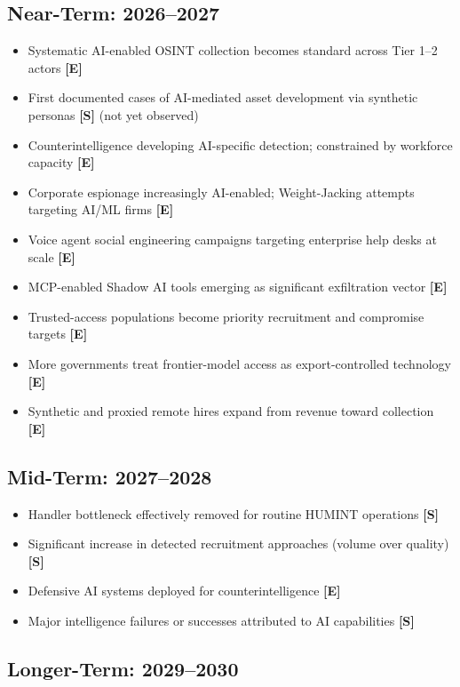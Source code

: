 \documentclass[11pt,letterpaper]{article}
\begin{document}
\subsection{Near-Term: 2026--2027}

\begin{itemize}
  \item Systematic AI-enabled OSINT collection becomes standard across Tier 1--2 actors \textbf{[E]}
  \item First documented cases of AI-mediated asset development via synthetic personas \textbf{[S]} (not yet observed)
  \item Counterintelligence developing AI-specific detection; constrained by workforce capacity \textbf{[E]}
  \item Corporate espionage increasingly AI-enabled; Weight-Jacking attempts targeting AI/ML firms \textbf{[E]}
  \item Voice agent social engineering campaigns targeting enterprise help desks at scale \textbf{[E]}
  \item MCP-enabled Shadow AI tools emerging as significant exfiltration vector \textbf{[E]}
  \item Trusted-access populations become priority recruitment and compromise targets \textbf{[E]}
  \item More governments treat frontier-model access as export-controlled technology \textbf{[E]}
  \item Synthetic and proxied remote hires expand from revenue toward collection \textbf{[E]}
\end{itemize}

\subsection{Mid-Term: 2027--2028}

\begin{itemize}
  \item Handler bottleneck effectively removed for routine HUMINT operations \textbf{[S]}
  \item Significant increase in detected recruitment approaches (volume over quality) \textbf{[S]}
  \item Defensive AI systems deployed for counterintelligence \textbf{[E]}
  \item Major intelligence failures or successes attributed to AI capabilities \textbf{[S]}
\end{itemize}

\subsection{Longer-Term: 2029--2030}
\end{document}
